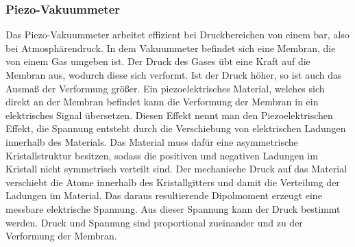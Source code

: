 \subsubsection{Piezo-Vakuummeter}
Das Piezo-Vakuummeter arbeitet effizient bei Druckbereichen von einem bar, also bei Atmosphärendruck.
In dem Vakuummeter befindet sich eine Membran, die von einem Gas umgeben ist. Der Druck des Gases übt eine Kraft auf die Membran aus,
wodurch diese sich verformt. Ist der Druck höher, so ist auch das Ausmaß der Verformung größer. Ein piezoelektrisches Material, welches sich direkt
an der Membran befindet kann die Verformung der Membran in ein elektrisches Signal übersetzen. Diesen Effekt nennt man den Piezoelektrischen Effekt, 
die Spannung entsteht durch die Verschiebung von elektrischen Ladungen innerhalb des Materials. Das Material muss dafür eine asymmetrische Kristallstruktur 
besitzen, sodass die positiven und negativen Ladungen im Kristall nicht symmetrisch verteilt sind. Der mechanische Druck auf das Material verschiebt die 
Atome innerhalb des Kristallgitters und damit die Verteilung der Ladungen im Material. Das daraus resultierende Dipolmoment erzeugt eine messbare elektrische
Spannung. Aus dieser Spannung kann der Druck bestimmt werden. Druck und Spannung sind proportional zueinander und zu der Verformung der Membran. 




\cite{sample}
